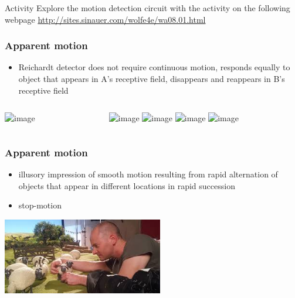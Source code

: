 \documentclass[]{beamer}
\begin{document}
\begin{frame}

\begin{block}{Activity}
Explore the motion detection circuit with the activity on the following webpage \url{http://sites.sinauer.com/wolfe4e/wa08.01.html}
\end{block}
\end{frame}



\begin{frame}
 \frametitle{Apparent motion}
 \begin{overlayarea}{110mm}{80mm}
\begin{itemize}
   \item Reichardt detector does not require continuous motion, responds equally to object that appears in A's receptive field, disappears and reappears in B's receptive field
\end{itemize}

\begin{columns}[T]
 \begin{column}{40mm}
\includegraphics<1->[width=30mm]{figs/l7/reichardt_detector_single.png}
 \end{column}

 \begin{column}{40mm}
\begin{center}
\includegraphics<2>[width=40mm]{figs/l7/daumenkino_daffy_1.png} 
\includegraphics<3>[width=40mm]{figs/l7/daumenkino_daffy_2.png} 
\includegraphics<4>[width=40mm]{figs/l7/daumenkino_daffy_3.png} 
\includegraphics<5>[width=40mm]{figs/l7/daumenkino_daffy_4.png} 
\end{center}
\end{column}
\end{columns}
\end{overlayarea}
\end{frame}


\begin{frame}
\frametitle{Apparent motion}
 \begin{itemize}
 \item illusory impression of smooth motion resulting from rapid alternation of objects that appear in different locations in rapid succession
 \item stop-motion
\end{itemize}
\begin{center}
\includegraphics[width=70mm]{figs/l7/filming_shaun2.jpg} 
\end{center}
\end{frame}
\end{document}
